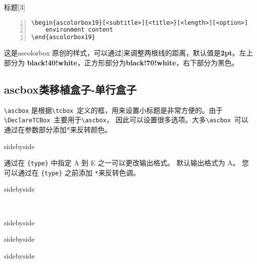 \begin{ascolorbox19}[子标题]{标题}[3]
    \zhlipsum[1]
\end{ascolorbox19}

\begin{lstlisting}[backgroundcolor=\color{gray!5},framerule=1pt,frame=tb,numbers=left,
    numberstyle=\tiny\color{black},]
\begin{ascolorbox19}[<subtitle>]{<title>}[<length>][<option>]
    environment content
\end{ascolorbox19}
\end{lstlisting}
这是ascolorbox 原创的样式，可以通过[\md{[⟨length⟩]}来调整两根线的距离，默认值是\textbf{2pt}。左上部分为
\textbf{black!40!white}，正方形部分为\textbf{black!70!white}，右下部分为黑色。

\subsection{ascbox类移植盒子-单行盒子}
\verb|\ascbox| 是根据\verb|\tcbox |定义的框，用来设置小标题是非常方便的。由于\verb|\DeclareTCBox |主要用于\verb|\ascbox|，
因此可以设置很多选项。大多\verb|\ascbox |可以通过在参数部分添加*来反转颜色。

\begin{tcblisting}{sidebyside}
    
\end{tcblisting}

通过在 \verb|{type}| 中指定 A 到 E 之一可以更改输出格式。 默认输出格式为 A。 您可以通过在 \verb|{type}| 之前添加 \verb|*|来反转色调。
\begin{tcblisting}{sidebyside}
    
\end{tcblisting}

\
\begin{tcblisting}{sidebyside}
    
\end{tcblisting}
\begin{tcblisting}{sidebyside}
    
\end{tcblisting}
\begin{tcblisting}{sidebyside}
    
\end{tcblisting}



